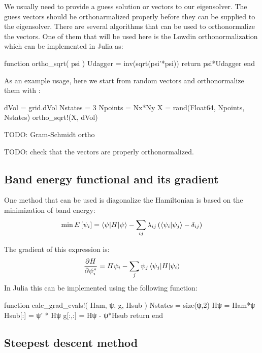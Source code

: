 We usually need to provide a guess solution or vectors to our eigensolver.
The guess vectors should be orthonarmalized properly before they can be supplied to
the eigensolver. There are several algorithms that can be used to orthonormalize
the vectors. One of them that will be used here is the Lowdin orthonormalization
which can be implemented in Julia as:
\begin{juliacode}
function ortho_sqrt( psi )
    Udagger = inv(sqrt(psi'*psi))
    return psi*Udagger
end
\end{juliacode}

As an example usage, here we start from random vectors and orthonormalize them
with :
\begin{juliacode}
dVol = grid.dVol
Nstates = 3
Npoints = Nx*Ny
X = rand(Float64, Npoints, Nstates)
ortho_sqrt!(X, dVol)
\end{juliacode}

TODO: Gram-Schmidt ortho

TODO: check that the vectors are properly orthonormalized.


\subsection{Band energy functional and its gradient}

One method that can be used is diagonalize the Hamiltonian is based on the minimization
of band energy:
\begin{equation}
\min E\left[{\psi_{i}}\right] = \braket{\psi | H | \psi} - \sum_{ij}\lambda_{ij}\left(
\braket{ \psi_{i} | \psi_{j} } - \delta_{ij}
\right)
\end{equation}

The gradient of this expression is:
\begin{equation}
\frac{\partial H}{\partial \psi^{*}_{i}} = H\psi_{i} -
\sum_{j} \psi_{j} \braket{\psi_{j} | H | \psi_{i}}
\end{equation}
%
In Julia this can be implemented using the following function:
%
\begin{juliacode}
function calc_grad_evals!( Ham, ψ, g, Hsub )
    Nstates = size(ψ,2)
    Hψ = Ham*ψ
    Hsub[:] = ψ' * Hψ
    g[:,:] = Hψ - ψ*Hsub
    return
end
\end{juliacode}

\subsection{Steepest descent method}

